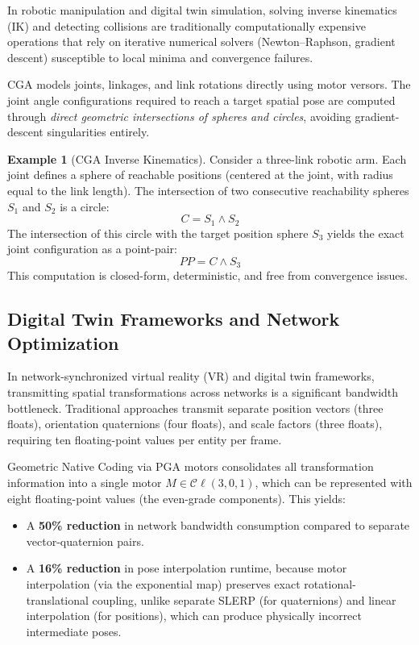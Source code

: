 \documentclass[manuscript, nonacm, review=false]{acmart}
\theoremstyle{definition}
\newtheorem{example}[definition]{Example}
\theoremstyle{plain}
\newcommand{\Cl}{\mathcal{C}\!\ell}
\begin{document}
In robotic manipulation and digital twin simulation, solving inverse kinematics (IK) and detecting collisions are traditionally computationally expensive operations that rely on iterative numerical solvers (Newton--Raphson, gradient descent) susceptible to local minima and convergence failures.

CGA models joints, linkages, and link rotations directly using motor versors. The joint angle configurations required to reach a target spatial pose are computed through \emph{direct geometric intersections of spheres and circles}, avoiding gradient-descent singularities entirely.

\begin{example}[CGA Inverse Kinematics]
\label{ex:ik}
Consider a three-link robotic arm. Each joint defines a sphere of reachable positions (centered at the joint, with radius equal to the link length). The intersection of two consecutive reachability spheres $S_1$ and $S_2$ is a circle:
\begin{equation}
    C = S_1 \wedge S_2
\end{equation}
The intersection of this circle with the target position sphere $S_3$ yields the exact joint configuration as a point-pair:
\begin{equation}
    PP = C \wedge S_3
\end{equation}
This computation is closed-form, deterministic, and free from convergence issues.
\end{example}


\subsection{Digital Twin Frameworks and Network Optimization}
\label{subsec:digital_twin}

In network-synchronized virtual reality (VR) and digital twin frameworks, transmitting spatial transformations across networks is a significant bandwidth bottleneck. Traditional approaches transmit separate position vectors (three floats), orientation quaternions (four floats), and scale factors (three floats), requiring ten floating-point values per entity per frame.

Geometric Native Coding via PGA motors consolidates all transformation information into a single motor $M \in \Cl(3,0,1)$, which can be represented with eight floating-point values (the even-grade components). This yields:
\begin{itemize}
    \item A \textbf{50\% reduction} in network bandwidth consumption compared to separate vector-quaternion pairs.
    \item A \textbf{16\% reduction} in pose interpolation runtime, because motor interpolation (via the exponential map) preserves exact rotational-translational coupling, unlike separate SLERP (for quaternions) and linear interpolation (for positions), which can produce physically incorrect intermediate poses.
\end{itemize}
\end{document}
